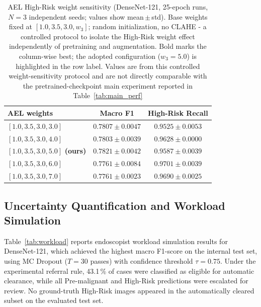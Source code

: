 \documentclass[11pt,a4paper]{article}
\begin{document}
\begin{table}[H]
\centering
\caption{AEL High-Risk weight sensitivity (DenseNet-121, 25-epoch runs,
  $N=3$ independent seeds; values show mean\,$\pm$\,std).
  Base weights fixed at $[1.0, 3.5, 3.0, w_3]$; random initialization,
  no CLAHE - a controlled protocol to isolate the High-Risk weight
  effect independently of pretraining and augmentation.
  Bold marks the column-wise best; the adopted configuration ($w_3=5.0$)
  is highlighted in the row label. Values are from this controlled
  weight-sensitivity protocol and are not directly comparable with the
  pretrained-checkpoint main experiment reported in
  Table~\ref{tab:main_perf}}
\label{tab:ael_sensitivity}
\begin{tabular}{lcc}
\toprule
\textbf{AEL weights} & \textbf{Macro F1} & \textbf{High-Risk Recall}\\
\midrule
$[1.0, 3.5, 3.0, 3.0]$ & $0.7807 \pm 0.0047$ & $0.9525 \pm 0.0053$\\
$[1.0, 3.5, 3.0, 4.0]$ & $0.7803 \pm 0.0039$ & $0.9628 \pm 0.0000$\\
$\mathbf{[1.0, 3.5, 3.0, 5.0]}$ \textbf{(ours)} & \textbf{$0.7821 \pm 0.0042$} & $0.9587 \pm 0.0039$\\
$[1.0, 3.5, 3.0, 6.0]$ & $0.7761 \pm 0.0084$ & \textbf{$0.9701 \pm 0.0039$}\\
$[1.0, 3.5, 3.0, 7.0]$ & $0.7761 \pm 0.0023$ & $0.9690 \pm 0.0025$\\
\bottomrule
\end{tabular}
\end{table}

\subsection{Uncertainty Quantification and Workload Simulation}

Table~\ref{tab:workload} reports endoscopist workload simulation results for
DenseNet-121, which achieved the highest macro F1-score on the internal test
set, using MC Dropout ($T=30$ passes) with confidence threshold $\tau=0.75$.
Under the experimental referral rule,
43.1\,\% of cases were classified as eligible for automatic clearance, while
all Pre-malignant and High-Risk predictions were escalated for review. No
ground-truth High-Risk images appeared in the automatically cleared subset
on the evaluated test set.
\end{document}
